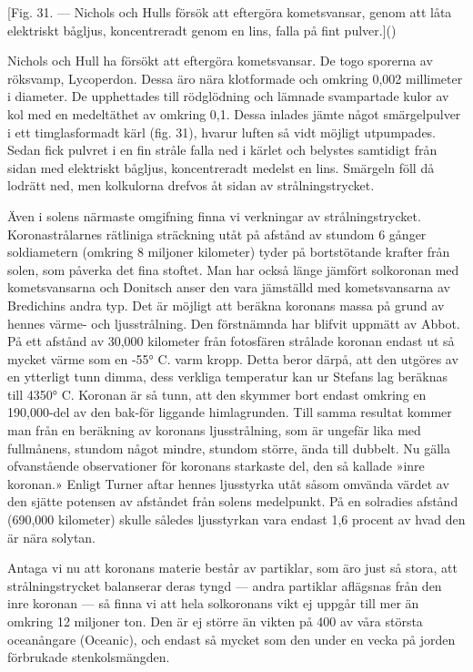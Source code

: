 \documentclass[a4paper, 12pt, oneside, swedish]{article}
\begin{document}
[Fig. 31. --- Nichols och Hulls försök att eftergöra kometsvansar, genom att låta elektriskt bågljus, koncentreradt genom en lins, falla på fint pulver.]()

Nichols och Hull ha försökt att eftergöra kometsvansar. De togo sporerna av röksvamp, Lycoperdon. Dessa äro nära klotformade och omkring 0,002 millimeter i diameter. De upphettades till rödglödning och lämnade svampartade kulor av kol med en medeltäthet av omkring 0,1. Dessa inlades jämte något smärgelpulver i ett timglasformadt kärl (fig. 31), hvarur luften så vidt möjligt utpumpades. Sedan fick pulvret i en fin stråle falla ned i kärlet och belystes samtidigt från sidan med elektriskt bågljus, koncentreradt medelst en lins. Smärgeln föll då lodrätt ned, men kolkulorna drefvos åt sidan av strålningstrycket.

Även i solens närmaste omgifning finna vi verkningar av strålningstrycket. Koronastrålarnes rätliniga sträckning utåt på afstånd av stundom 6 gånger soldiametern (omkring 8 miljoner kilometer) tyder på bortstötande krafter från solen, som påverka det fina stoftet. Man har också länge jämfört solkoronan med kometsvansarna och Donitsch anser den vara jämställd med kometsvansarna av Bredichins andra typ. Det är möjligt att beräkna koronans massa på grund av hennes värme- och ljusstrålning. Den förstnämnda har blifvit uppmätt av Abbot. På ett afstånd av 30,000 kilometer från fotosfären strålade koronan endast ut så mycket värme som en -55° C. varm kropp. Detta beror därpå, att den utgöres av en ytterligt tunn dimma, dess verkliga temperatur kan ur Stefans lag beräknas till 4350° C. Koronan är så tunn, att den skymmer bort endast omkring en 190,000-del av den bak-för liggande himlagrunden. Till samma resultat kommer man från en beräkning av koronans ljusstrålning, som är ungefär lika med fullmånens, stundom något mindre, stundom större, ända till dubbelt. Nu gälla ofvanstående observationer för koronans starkaste del, den så kallade »inre koronan.» Enligt Turner aftar hennes ljusstyrka utåt såsom omvända värdet av den sjätte potensen av afståndet från solens medelpunkt. På en solradies afstånd (690,000 kilometer) skulle således ljusstyrkan vara endast 1,6 procent av hvad den är nära solytan.

Antaga vi nu att koronans materie består av partiklar, som äro just så stora, att strålningstrycket balanserar deras tyngd --- andra partiklar aflägsnas från den inre koronan --- så finna vi att hela solkoronans vikt ej uppgår till mer än omkring 12 miljoner ton. Den är ej större än vikten på 400 av våra största oceanångare (Oceanic), och endast så mycket som den under en vecka på jorden förbrukade stenkolsmängden.
\end{document}
